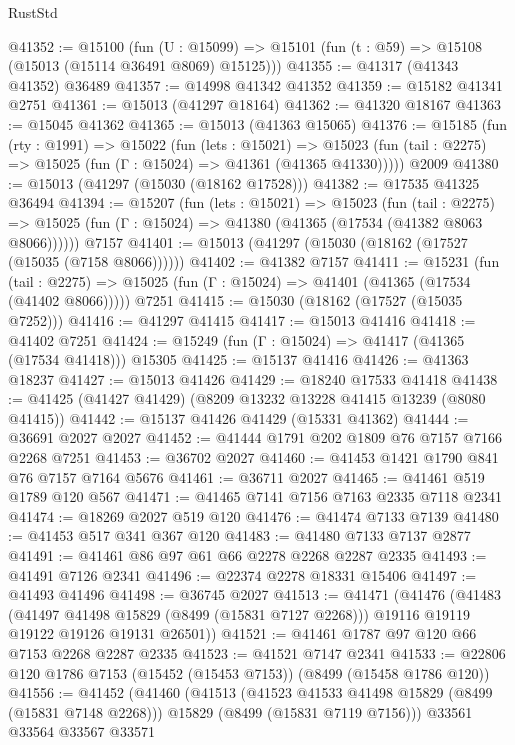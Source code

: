 \begin{lexlean}{RustStd}
\begin{coremodule}
@41352 := @15100
    (fun (U : @15099) => @15101 (fun (t : @59) => @15108 (@15013 (@15114 @36491 @8069) @15125)))
@41355 := @41317 (@41343 @41352) @36489
@41357 := @14998 @41342 @41352
@41359 := @15182 @41341 @2751
@41361 := @15013 (@41297 @18164)
@41362 := @41320 @18167
@41363 := @15045 @41362
@41365 := @15013 (@41363 @15065)
@41376 := @15185
    (fun (rty : @1991) =>
    @15022
      (fun (lets : @15021) =>
      @15023 (fun (tail : @2275) => @15025 (fun (Γ : @15024) => @41361 (@41365 @41330)))))
    @2009
@41380 := @15013 (@41297 (@15030 (@18162 @17528)))
@41382 := @17535 @41325 @36494
@41394 := @15207
    (fun (lets : @15021) =>
    @15023
      (fun (tail : @2275) =>
      @15025 (fun (Γ : @15024) => @41380 (@41365 (@17534 (@41382 @8063 @8066))))))
    @7157
@41401 := @15013 (@41297 (@15030 (@18162 (@17527 (@15035 (@7158 @8066))))))
@41402 := @41382 @7157
@41411 := @15231
    (fun (tail : @2275) => @15025 (fun (Γ : @15024) => @41401 (@41365 (@17534 (@41402 @8066)))))
    @7251
@41415 := @15030 (@18162 (@17527 (@15035 @7252)))
@41416 := @41297 @41415
@41417 := @15013 @41416
@41418 := @41402 @7251
@41424 := @15249 (fun (Γ : @15024) => @41417 (@41365 (@17534 @41418))) @15305
@41425 := @15137 @41416
@41426 := @41363 @18237
@41427 := @15013 @41426
@41429 := @18240 @17533 @41418
@41438 := @41425 (@41427 @41429) (@8209 @13232 @13228 @41415 @13239 (@8080 @41415))
@41442 := @15137 @41426 @41429 (@15331 @41362)
@41444 := @36691 @2027 @2027
@41452 := @41444 @1791 @202 @1809 @76 @7157 @7166 @2268 @7251
@41453 := @36702 @2027
@41460 := @41453 @1421 @1790 @841 @76 @7157 @7164 @5676
@41461 := @36711 @2027
@41465 := @41461 @519 @1789 @120 @567
@41471 := @41465 @7141 @7156 @7163 @2335 @7118 @2341
@41474 := @18269 @2027 @519 @120
@41476 := @41474 @7133 @7139
@41480 := @41453 @517 @341 @367 @120
@41483 := @41480 @7133 @7137 @2877
@41491 := @41461 @86 @97 @61 @66 @2278 @2268 @2287 @2335
@41493 := @41491 @7126 @2341
@41496 := @22374 @2278 @18331 @15406
@41497 := @41493 @41496
@41498 := @36745 @2027
@41513 := @41471
    (@41476
      (@41483
        (@41497 @41498 @15829 (@8499 (@15831 @7127 @2268)))
        @19116
        @19119
        @19122
        @19126
        @19131
        @26501))
@41521 := @41461 @1787 @97 @120 @66 @7153 @2268 @2287 @2335
@41523 := @41521 @7147 @2341
@41533 := @22806 @120 @1786 @7153 (@15452 (@15453 @7153)) (@8499 (@15458 @1786 @120))
@41556 := @41452
    (@41460
      (@41513
        (@41523 @41533 @41498 @15829 (@8499 (@15831 @7148 @2268)))
        @15829
        (@8499 (@15831 @7119 @7156)))
      @33561
      @33564
      @33567
      @33571

\end{coremodule}
\end{lexlean}
